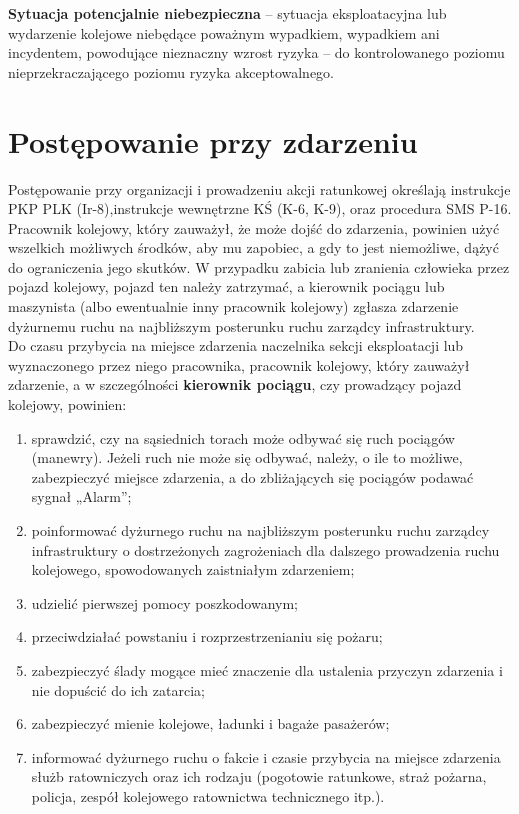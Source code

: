 \textbf{Sytuacja potencjalnie niebezpieczna} – sytuacja eksploatacyjna lub wydarzenie kolejowe niebędące poważnym wypadkiem, wypadkiem ani incydentem, powodujące nieznaczny wzrost ryzyka – do kontrolowanego poziomu nieprzekraczającego poziomu ryzyka akceptowalnego.

\section{Postępowanie przy zdarzeniu}
Postępowanie przy organizacji i prowadzeniu akcji ratunkowej określają instrukcje PKP PLK (Ir-8),instrukcje wewnętrzne KŚ (K-6, K-9), oraz procedura SMS P-16.
\\Pracownik kolejowy, który zauważył, że może dojść do zdarzenia, powinien użyć wszelkich możliwych środków, aby mu zapobiec, a gdy to jest niemożliwe, dążyć do ograniczenia jego skutków. 
W przypadku zabicia lub zranienia człowieka przez pojazd kolejowy, pojazd ten należy zatrzymać, a kierownik pociągu lub maszynista (albo ewentualnie inny pracownik kolejowy) zgłasza zdarzenie dyżurnemu ruchu na najbliższym posterunku ruchu zarządcy infrastruktury.
\\Do czasu przybycia na miejsce zdarzenia naczelnika sekcji eksploatacji lub wyznaczonego przez niego pracownika, pracownik kolejowy, który zauważył zdarzenie, a w szczególności \textbf{kierownik pociągu}, czy prowadzący pojazd kolejowy, powinien:
\begin{enumerate}
	\item sprawdzić, czy na sąsiednich torach może odbywać się ruch pociągów (manewry).
	Jeżeli ruch nie może się odbywać, należy, o ile to możliwe, zabezpieczyć miejsce zdarzenia, a do zbliżających się pociągów podawać sygnał „Alarm”;
	\item poinformować dyżurnego ruchu na najbliższym posterunku ruchu zarządcy infrastruktury o dostrzeżonych zagrożeniach dla dalszego prowadzenia ruchu kolejowego, spowodowanych zaistniałym zdarzeniem;
	\item udzielić pierwszej pomocy poszkodowanym;
	\item przeciwdziałać powstaniu i rozprzestrzenianiu się pożaru;
	\item zabezpieczyć ślady mogące mieć znaczenie dla ustalenia przyczyn zdarzenia i nie dopuścić do ich zatarcia;
	\item zabezpieczyć mienie kolejowe, ładunki i bagaże pasażerów;
	\item informować dyżurnego ruchu o fakcie i czasie przybycia na miejsce zdarzenia służb	ratowniczych oraz ich rodzaju (pogotowie ratunkowe, straż pożarna, policja, zespół kolejowego ratownictwa technicznego itp.).
\end{enumerate}

